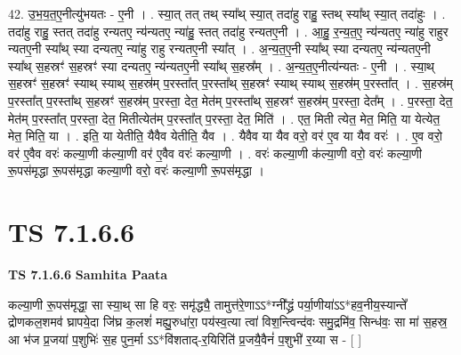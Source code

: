 \documentclass[17pt]{extarticle}
\begin{document}
42. उ॒भ॒य॒त॒ए॒नीत्यु॑भयतः - ए॒नी । . स्या॒त् तत् तथ् स्या᳚थ् स्या॒त् तदा॑हु राहु॒ स्तथ् स्या᳚थ् स्या॒त् तदा॑हुः । . तदा॑हु राहु॒ स्तत् तदा॑हु रन्यतए॒ न्य॑न्यतए॒ न्या॑हु॒ स्तत् तदा॑हु रन्यतए॒नी । . आ॒हु॒ र॒न्य॒त॒ए॒ न्य॑न्यतए॒ न्या॑हु राहुर न्यतए॒नी स्या᳚थ् स्या दन्यतए॒ न्या॑हु राहु रन्यतए॒नी स्या᳚त् । . अ॒न्य॒त॒ए॒नी स्या᳚थ् स्या दन्यतए॒ न्य॑न्यतए॒नी स्या᳚थ् स॒हस्रꣳ॑ स॒हस्रꣳ॑ स्या दन्यतए॒ न्य॑न्यतए॒नी स्या᳚थ् स॒हस्र᳚म् । . अ॒न्य॒त॒ए॒नीत्य॑न्यतः - ए॒नी । . स्या॒थ् स॒हस्रꣳ॑ स॒हस्रꣳ॑ स्याथ् स्याथ् स॒हस्र॑म् प॒रस्ता᳚त् प॒रस्ता᳚थ् स॒हस्रꣳ॑ स्याथ् स्याथ् स॒हस्र॑म् प॒रस्ता᳚त् । . स॒हस्र॑म् प॒रस्ता᳚त् प॒रस्ता᳚थ् स॒हस्रꣳ॑ स॒हस्र॑म् प॒रस्ता॒ देत॒ मेत॑म् प॒रस्ता᳚थ् स॒हस्रꣳ॑ स॒हस्र॑म् प॒रस्ता॒ देत᳚म् । . प॒रस्ता॒ देत॒ मेत॑म् प॒रस्ता᳚त् प॒रस्ता॒ देत॒ मितीत्येत॑म् प॒रस्ता᳚त् प॒रस्ता॒ देत॒ मिति॑ । . एत॒ मिती त्येत॒ मेत॒ मिति॒ या येत्येत॒ मेत॒ मिति॒ या । . इति॒ या येतीति॒ यैवैव येतीति॒ यैव । . यैवैव या यैव वरो॒ वर॑ ए॒व या यैव वरः॑ । . ए॒व वरो॒ वर॑ ए॒वैव वरः॑ कल्या॒णी क॑ल्या॒णी वर॑ ए॒वैव वरः॑ कल्या॒णी । . वरः॑ कल्या॒णी क॑ल्या॒णी वरो॒ वरः॑ कल्या॒णी रू॒पस॑मृद्धा रू॒पस॑मृद्धा कल्या॒णी वरो॒ वरः॑ कल्या॒णी रू॒पस॑मृद्धा । \newline
\pagebreak
{}

\section{ TS 7.1.6.6 }

\textbf{TS 7.1.6.6 } \newline
\textbf{Samhita Paata} \newline

कल्या॒णी रू॒पस॑मृद्धा॒ सा स्या॒थ् सा हि वरः॒ समृ॑द्ध्यै॒ तामुत्त॑रे॒णाऽऽ*ग्नी᳚द्ध्रं पर्या॒णीया॑ऽऽ*हव॒नीय॒स्यान्ते᳚ द्रोणकल॒शमव॑ घ्रापये॒दा जि॑घ्र क॒लशं॑ मह्यु॒रुधा॑रा॒ पय॑स्व॒त्या त्वा॑ विश॒न्त्विन्द॑वः समु॒द्रमि॑व॒ सिन्ध॑वः॒ सा मा॑ स॒हस्र॒ आ भ॑ज प्र॒जया॑ प॒शुभिः॑ स॒ह पुन॒र्मा ऽऽ*वि॑शताद्-र॒यिरिति॑ प्र॒जयै॒वैनं॑ प॒शुभी॑ र॒य्या स - [  ] \newline
\end{document}
